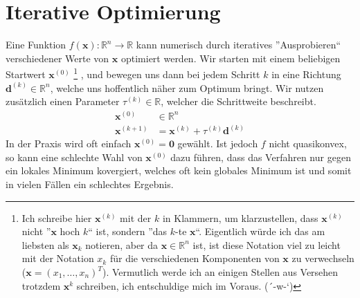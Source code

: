 \documentclass{report}
\begin{document}
\section{Iterative Optimierung}
Eine Funktion $f(\bm{x}): \mathbb{R}^n \to \mathbb{R}$ kann numerisch durch iteratives ''Ausprobieren`` verschiedener Werte von $\bm{x}$ optimiert werden. Wir starten mit einem beliebigen Startwert $\bm{x}^{(0)}$
    \footnote{Ich schreibe hier $\bm{x}^{(k)}$ mit der $k$ in Klammern, um klarzustellen, dass $\bm{x}^{(k)}$ nicht ''$\bm{x}$ hoch $k$`` ist, sondern ''das $k$-te $\bm{x}$``. Eigentlich würde ich das am liebsten als $\bm{x}_k$ notieren, aber da $\bm{x} \in \mathbb{R}^n$ ist, ist diese Notation viel zu leicht mit der Notation $x_k$ für die verschiedenen Komponenten von $\bm{x}$ zu verwechseln ($\bm{x} = (x_1, \hdots, x_n)^T$). Vermutlich werde ich an einigen Stellen aus Versehen trotzdem $\bm{x}^k$ schreiben, ich entschuldige mich im Voraus. (´-w-`)}
, und bewegen uns dann bei jedem Schritt $k$ in eine Richtung $\bm{d}^{(k)} \in \mathbb{R}^n$, welche uns hoffentlich näher zum Optimum bringt. Wir nutzen zusätzlich einen Parameter $\tau^{(k)} \in \mathbb{R}$, welcher die Schrittweite beschreibt.
\begin{align*}
 \bm{x}^{(0)} &\in \mathbb{R}^n\\
 \bm{x}^{(k+1)} &= \bm{x}^{(k)} + \tau^{(k)} \bm{d}^{(k)}
\end{align*}
In der Praxis wird oft einfach $\bm{x}^{(0)} = \bm{0}$ gewählt. Ist jedoch $f$ nicht quasikonvex, so kann eine schlechte Wahl von $\bm{x}^{(0)}$ dazu führen, dass das Verfahren nur gegen ein lokales Minimum kovergiert, welches oft kein globales Minimum ist und somit in vielen Fällen ein schlechtes Ergebnis.
\end{document}
